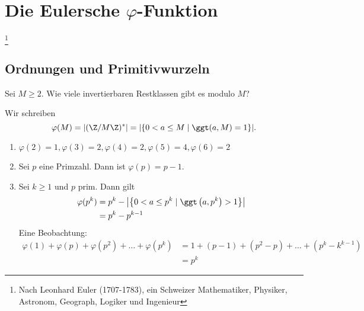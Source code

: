 \chapter{Die Eulersche $\varphi$-Funktion}\footnote{Nach Leonhard Euler (1707-1783), ein Schweizer Mathematiker, Physiker, Astronom, Geograph, Logiker und Ingenieur}
\section*{Ordnungen und Primitivwurzeln}

\begin{frage*}
	Sei $M \geq 2$. Wie viele invertierbaren Restklassen gibt es modulo $M$?
\end{frage*}

\begin{notat*}
	Wir schreiben
	\[ \varphi(M) = |(\Z/M\Z)^*| = |\{0 < a \leq M \mid \ggt(a,M) = 1\}|. \]
\end{notat*}

\begin{exmp*}
	\begin{enumerate}[label={\roman*})]
		\item $\varphi(2) = 1, \varphi(3)=2, \varphi(4)=2, \varphi(5)=4, \varphi(6)=2$\\
		\item Sei $p$ eine Primzahl. Dann ist $\varphi(p) = p-1$.
		\item Sei $k \geq 1$ und $p$ prim. Dann gilt
			\begin{align*}
				\varphi(p^k) &= p^k - \left|\left\{0 < a \leq p^k \mid \ggt\left(a,p^k\right)>1\right\}\right|\\
				&= p^k - p^{k-1}
			\end{align*}
			Eine Beobachtung:
			\begin{align*}
				\varphi(1) + \varphi(p) + \varphi(p^2) + \dots + \varphi(p^k) &= 1 + (p-1) + (p^2-p) + \dots + (p^k-k^{k-1}) \\
				&= p^k
			\end{align*}
	\end{enumerate}
\end{exmp*}

